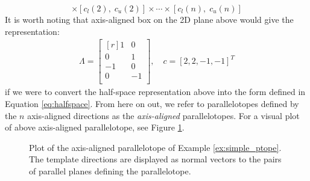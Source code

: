 \begin{example}
\begin{equation}
[c_l(1), \;c_u(1)] \times [c_l(2),\; c_u(2)] \times \cdots \times [c_l(n), \; c_u(n)]
\end{equation}
%
It is worth noting that axis-aligned box on the 2D plane above would give the representation:
\begin{align}
  \Lambda = \begin{bmatrix*}[r]
            1 & 0 \\
            0 & 1 \\
            -1 & 0 \\
            0 & -1 \\
            \end{bmatrix*} , \quad c = [2,2,-1,-1]^T
\end{align}
if we were to convert the half-space representation above into the form defined in Equation \ref{eq:halfspace}.
%
From here on out, we refer to parallelotopes defined by the $n$ axis-aligned directions as the \emph{axis-aligned} parallelotopes.
%
For a visual plot of above axis-aligned parallelotope, see Figure \ref{fig:axis_align_ptope}.

\begin{figure}[h!]
  \centering
  \caption{Plot of the axis-aligned parallelotope of Example \ref{ex:simple_ptope}. The template directions are displayed as normal vectors to the pairs of parallel planes defining the parallelotope.}
  \label{fig:axis_align_ptope}
\end{figure}

\end{example}

